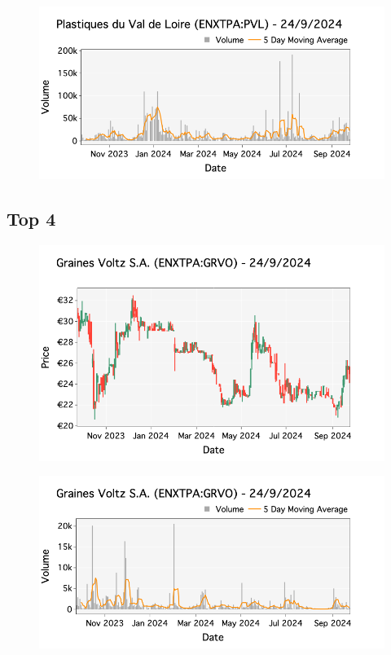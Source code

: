 \documentclass[a4paper, twocolumn, 11pt, paperequity]{gorgona}
\begin{document}
\begin{figure}[H]
    \centering
    \includegraphics[width=\columnwidth]{France/images/Top_Returns/Top_3_volume.png}
\end{figure}

\subsection*{Top 4}

\begin{figure}[H]
    \centering
    \includegraphics[width=\columnwidth]{France/images/Top_Returns/Top_4_candlestick.png}
\end{figure}

\begin{figure}[H]
    \centering
    \includegraphics[width=\columnwidth]{France/images/Top_Returns/Top_4_volume.png}
\end{figure}
\end{document}
